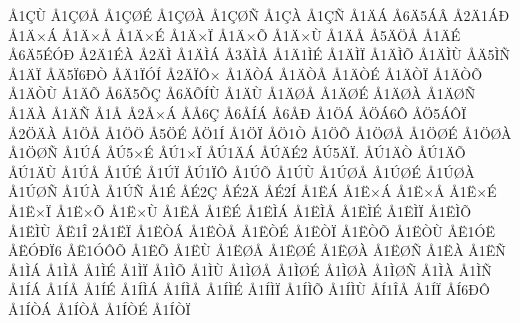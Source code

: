 {^^c51^^c7^^d9
^^c51^^c7^^d8^^c5
^^c51^^c7^^d8^^c9
^^c51^^c7^^d8^^c0
^^c51^^c7^^d8^^d1
^^c51^^c7^^c0
^^c51^^c7^^d1
^^c51^^c4^^c1
^^c56^^c45^^c1^^c2
^^c52^^c41^^c1^^d0
^^c51^^c4^^d7^^c1
^^c51^^c4^^d7^^c5
^^c51^^c4^^d7^^c9
^^c51^^c4^^d7^^cf
^^c51^^c4^^d7^^d5
^^c51^^c4^^d7^^d9
^^c51^^c4^^c5
^^c55^^c4^^d6^^c5
^^c51^^c4^^c9
^^c56^^c45^^c9^^d3^^d0
^^c52^^c41^^c9^^c0
^^c52^^c4^^cc
^^c51^^c4^^cc^^c1
^^c53^^c4^^cc^^c5
^^c51^^c41^^cc^^c9
^^c51^^c4^^cc^^cf
^^c51^^c4^^cc^^d5
^^c51^^c4^^cc^^d9
^^c5^^c45^^cc^^d1
^^c51^^c4^^cf
^^c5^^c45^^cf6^^d0^^d2
^^c5^^c41^^cf^^d3^^cd
^^c52^^c4^^cf^^d4^^d7
^^c51^^c4^^d2^^c1
^^c51^^c4^^d2^^c5
^^c51^^c4^^d2^^c9
^^c51^^c4^^d2^^cf
^^c51^^c4^^d2^^d5
^^c51^^c4^^d2^^d9
^^c51^^c4^^d5
^^c56^^c45^^d5^^c7
^^c56^^c4^^d5^^cd^^d9
^^c51^^c4^^d9
^^c51^^c4^^d8^^c5
^^c51^^c4^^d8^^c9
^^c51^^c4^^d8^^c0
^^c51^^c4^^d8^^d1
^^c51^^c4^^c0
^^c51^^c4^^d1
^^c51^^c5
^^c52^^c5^^d7^^c1
^^c5^^c56^^c7
^^c56^^c5^^cd^^c1
^^c56^^c5^^d0
^^c51^^d6^^c1
^^c5^^d6^^c16^^d4
^^c5^^d65^^c1^^d4^^cf
^^c52^^d6^^c4^^c0
^^c51^^d6^^c5
^^c51^^d6^^d6
^^c55^^d6^^c9
^^c5^^d61^^cd
^^c51^^d6^^cf
^^c5^^d61^^d2
^^c51^^d6^^d5
^^c51^^d6^^d8^^c5
^^c51^^d6^^d8^^c9
^^c51^^d6^^d8^^c0
^^c51^^d6^^d8^^d1
^^c51^^da^^c1
^^c5^^da5^^d7^^c9
^^c5^^da1^^d7^^cf
^^c5^^da1^^c4^^c1
^^c5^^da^^c4^^c92
^^c5^^da5^^c4^^cf.
^^c5^^da1^^c4^^d2
^^c5^^da1^^c4^^d5
^^c5^^da1^^c4^^d9
^^c51^^da^^c5
^^c51^^da^^c9
^^c51^^da^^cf
^^c5^^da1^^cf^^d4
^^c51^^da^^d5
^^c51^^da^^d9
^^c51^^da^^d8^^c5
^^c51^^da^^d8^^c9
^^c51^^da^^d8^^c0
^^c51^^da^^d8^^d1
^^c51^^da^^c0
^^c51^^da^^d1
^^c51^^c9
^^c5^^c92^^c7
^^c5^^c92^^c4
^^c5^^c92^^cd
^^c51^^cb^^c1
^^c51^^cb^^d7^^c1
^^c51^^cb^^d7^^c5
^^c51^^cb^^d7^^c9
^^c51^^cb^^d7^^cf
^^c51^^cb^^d7^^d5
^^c51^^cb^^d7^^d9
^^c51^^cb^^c5
^^c51^^cb^^c9
^^c51^^cb^^cc^^c1
^^c51^^cb^^cc^^c5
^^c51^^cb^^cc^^c9
^^c51^^cb^^cc^^cf
^^c51^^cb^^cc^^d5
^^c51^^cb^^cc^^d9
^^c5^^cb1^^ce
2^^c51^^cb^^cf
^^c51^^cb^^d2^^c1
^^c51^^cb^^d2^^c5
^^c51^^cb^^d2^^c9
^^c51^^cb^^d2^^cf
^^c51^^cb^^d2^^d5
^^c51^^cb^^d2^^d9
^^c5^^cb1^^d3^^cb
^^c5^^cb^^d3^^d0^^cf6
^^c5^^cb1^^d3^^d4^^d5
^^c51^^cb^^d5
^^c51^^cb^^d9
^^c51^^cb^^d8^^c5
^^c51^^cb^^d8^^c9
^^c51^^cb^^d8^^c0
^^c51^^cb^^d8^^d1
^^c51^^cb^^c0
^^c51^^cb^^d1
^^c51^^cc^^c1
^^c51^^cc^^c5
^^c51^^cc^^c9
^^c51^^cc^^cf
^^c51^^cc^^d5
^^c51^^cc^^d9
^^c51^^cc^^d8^^c5
^^c51^^cc^^d8^^c9
^^c51^^cc^^d8^^c0
^^c51^^cc^^d8^^d1
^^c51^^cc^^c0
^^c51^^cc^^d1
^^c51^^cd^^c1
^^c51^^cd^^c5
^^c51^^cd^^c9
^^c51^^cd^^cc^^c1
^^c51^^cd^^cc^^c5
^^c51^^cd^^cc^^c9
^^c51^^cd^^cc^^cf
^^c51^^cd^^cc^^d5
^^c51^^cd^^cc^^d9
^^c5^^cd1^^ce^^c5
^^c51^^cd^^cf
^^c5^^cd6^^d0^^d4
^^c51^^cd^^d2^^c1
^^c51^^cd^^d2^^c5
^^c51^^cd^^d2^^c9
^^c51^^cd^^d2^^cf
}
